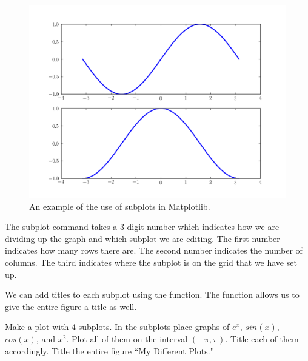 \begin{figure}
\includegraphics[width=\textwidth]{subplots.pdf}
\caption{An example of the use of subplots in Matplotlib.}
\label{mpl:subplots}
\end{figure}

The subplot command takes a 3 digit number which indicates how we are dividing up the graph and which subplot we are editing.
The first number indicates how many rows there are.
The second number indicates the number of columns.
The third indicates where the subplot is on the grid that we have set up. 

We can add titles to each subplot using the  function.
The  function allows us to give the entire figure a title as well.

\begin{problem}
Make a plot with 4 subplots.
In the subplots place graphs of $e^x$, $sin(x)$, $cos(x)$, and $x^2$.
Plot all of them on the interval $(-\pi,\pi)$.
Title each of them accordingly.
Title the entire figure ``My Different Plots."
\end{problem}
